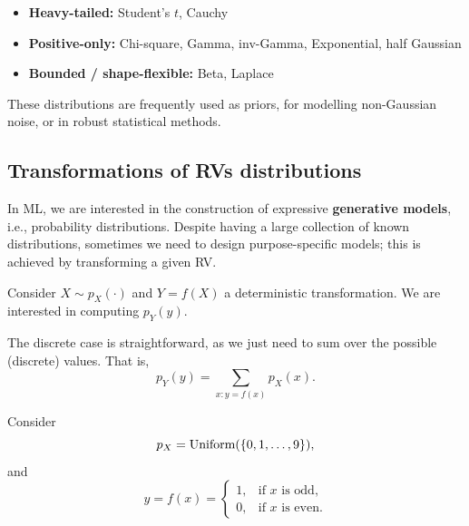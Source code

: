 \begin{itemize}
    \item \textbf{Heavy-tailed:} Student's $t$, Cauchy
    \item \textbf{Positive-only:} Chi-square, Gamma, inv-Gamma, Exponential, half Gaussian
    \item \textbf{Bounded / shape-flexible:} Beta, Laplace
\end{itemize}

These distributions are frequently used as priors, for modelling non-Gaussian noise, or in robust statistical methods.


\subsection{Transformations of RVs distributions}
\label{cap:prob_transRVs}

In ML, we are interested in the construction of expressive \textbf{generative models}, i.e., probability distributions. Despite having a large collection of known distributions, sometimes we need to design purpose-specific models; this is achieved by transforming a given RV. 

Consider $X\sim p_X(\cdot)$ and $Y=f(X)$ a deterministic transformation. We are interested in computing $p_Y(y)$.

The discrete case is straightforward, as we just need to sum over the possible (discrete) values. That is, 
\begin{equation}
	p_Y(y) = \sum_{x:y=f(x)}p_X(x).
\end{equation}

\begin{example}
Consider 
\begin{equation}
	p_X = \text{Uniform}(\{0,1,\ldots,9\}),
\end{equation}
and 
\[
y = f(x) =
\begin{cases}
1, & \text{if } x \text{ is odd}, \\[4pt]
0, & \text{if } x \text{ is even.}
\end{cases}
\]

\end{example}

